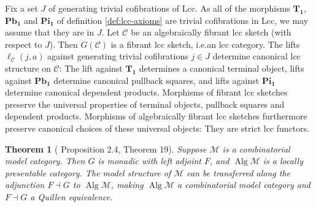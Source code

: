 \documentclass{article}
\newtheorem{theorem}{Theorem}
\theoremstyle{remark}
\theoremstyle{definition}
\begin{document}
Fix a set $J$ of generating trivial cofibrations of $\mathrm{Lcc}$.
As all of the morphisms $\mathbf{T_1}$, $\mathbf{Pb_1}$ and $\mathbf{Pi_1}$ of definition \ref{def:lcc-axioms} are trivial cofibrations in $\mathrm{Lcc}$, we may assume that they are in $J$.
Let $\mathcal{C}$ be an algebraically fibrant lcc sketch (with respect to $J$).
Then $G(\mathcal{C})$ is a fibrant lcc sketch, i.e.\@ an lcc category.
The lifts $\ell_\mathcal{C}(j, a)$ against generating trivial cofibrations $j \in J$ determine canonical lcc structure on $\mathcal{C}$:
The lift against $\mathbf{T_1}$ determines a canonical terminal object, lifts against $\mathbf{Pb_1}$ determine canonical pullback squares, and lifts against $\mathbf{Pi_1}$ determine canonical dependent products.
Morphisms of fibrant lcc sketches preserve the universal properties of terminal objects, pullback squares and dependent products.
Morphisms of algebraically fibrant lcc sketches furthermore preserve canonical choices of these universal objects:
They are strict lcc functors.

\begin{theorem}[\cite{algebraic-models} Proposition 2.4, \cite{equipping-weak-equivalences} Theorem 19]
  \label{th:algebraically-fibrant-model-category}
  Suppose $\mathcal{M}$ is a combinatorial model category.
  Then $G$ is monadic with left adjoint $F$, and $\operatorname{Alg} \mathcal{M}$ is a locally presentable category.
  The model structure of $\mathcal{M}$ can be transferred along the adjunction $F \dashv G$ to $\operatorname{Alg} \mathcal{M}$, making $\operatorname{Alg} \mathcal{M}$ a combinatorial model category and $F \dashv G$ a Quillen equivalence.
\end{theorem}
\end{document}
